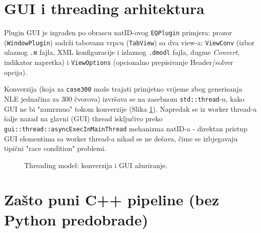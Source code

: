 \documentclass[11pt,a4paper]{report}
\begin{document}
\section{GUI i threading arhitektura}

Plugin GUI je izgrađen po obrascu natID-ovog \texttt{EQPlugin} primjera: prozor
(\texttt{WindowPlugin}) sadrži tabovanu vrpcu (\texttt{TabView}) sa dva view-a:
\texttt{ViewConv} (izbor ulaznog \texttt{.m} fajla, XML konfiguracije i izlaznog
\texttt{.dmodl} fajla, dugme \emph{Convert}, indikator napretka) i \texttt{ViewOptions}
(opcionalno prepisivanje Header/solver opcija).

Konverzija (koja za \texttt{case300} može trajati primjetno vrijeme zbog generisanja
NLE jednačina za 300 čvorova) izvršava se na zasebnom \texttt{std::thread}-u, kako GUI ne
bi "zamrznuo" tokom konverzije (Slika \ref{fig:threading}). Napredak se iz worker thread-a
šalje nazad na glavni (GUI) thread isključivo preko
\texttt{gui::thread::asyncExecInMainThread} mehanizma natID-a - direktan pristup GUI
elementima sa worker thread-a nikad se ne dešava, čime se izbjegavaju tipični
"race condition" problemi.

\begin{figure}[H]
\centering
{}
\caption{Threading model: konverzija i GUI ažuriranje.}
\label{fig:threading}
\end{figure}

\section{Zašto puni C++ pipeline (bez Python predobrade)}
\end{document}
